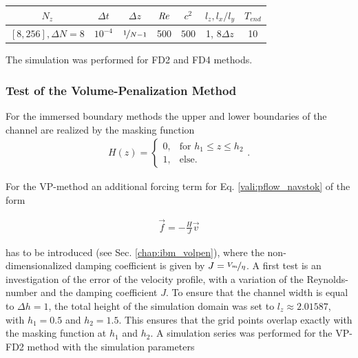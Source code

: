 \begin{center}
\vspace*{0.7ex}
\begin{tabular}{c|c|c|c|c|c|c }
 $ N_z  $                   & $\Delta t$ & $\Delta z$            & $\mbox{\textit{Re}}$  & $c^2$   & $l_z, l_x/l_y$ & $T_{end}$\\
\hline
 $[8, 256], \Delta N = 8 $& $10^{-4}$ & $\nicefrac{1}{N - 1}$ & 500     & $500$   &  1, 8$\Delta z$ &  10\\
\end{tabular}
\vspace*{0.7ex}
\end{center}

The simulation was performed for FD2 and FD4 methods.

\subsubsection{Test of the Volume-Penalization Method}


For the immersed boundary methods the upper and lower boundaries of the channel are realized by the masking function
\begin{align}
H(z) = \begin{cases}
                    0, & \text{for \  }  h_1 \leq z \leq h_2 \\
                    1, & \text{else}.
             \end{cases}.
\end{align}

For the VP-method an additional forcing term for Eq. \ref{vali:pflow_navstok} of the form

\begin{align}
    \vec{f} = -\frac{H}{J}\vec{v}
\end{align}

has to be introduced (see Sec. \ref{chap:ibm_volpen}),
where the non-dimensionalized damping coefficient is given by $J = \nicefrac{V_{m}}{\eta}$.
A first test is an investigation of the error of the velocity profile, with a variation of the Reynolds-number and the damping coefficient $J$.
To ensure that the channel width is equal to $\Delta h = 1$, the total height of the simulation domain was set to $l_z\approx2.01587$,
with $h_1=0.5$ and $h_2=1.5$.
This ensures that the grid points overlap exactly with the masking function at $h_1$ and $h_2$.
A simulation series was performed for the VP-FD2 method with the simulation parameters


